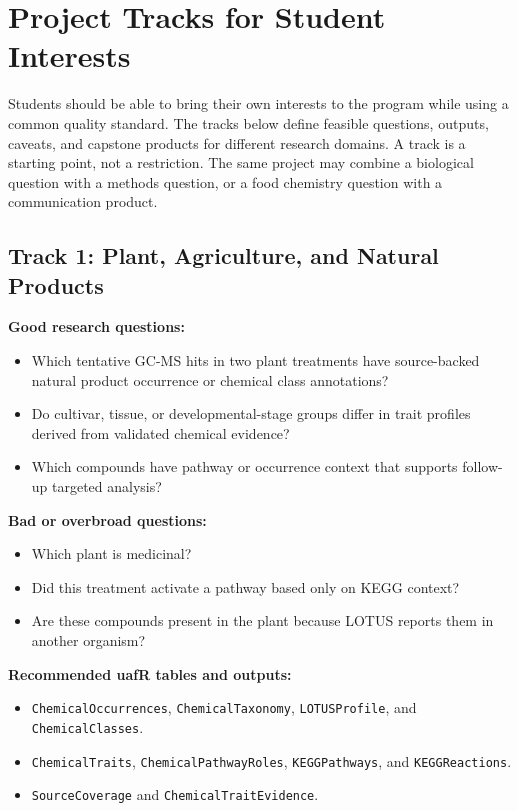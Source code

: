 \chapter{Project Tracks for Student Interests}

Students should be able to bring their own interests to the program while using a common quality standard. The tracks below define feasible questions, outputs, caveats, and capstone products for different research domains. A track is a starting point, not a restriction. The same project may combine a biological question with a methods question, or a food chemistry question with a communication product.

\section{Track 1: Plant, Agriculture, and Natural Products}
\textbf{Good research questions:}
\begin{itemize}
  \item Which tentative GC-MS hits in two plant treatments have source-backed natural product occurrence or chemical class annotations?
  \item Do cultivar, tissue, or developmental-stage groups differ in trait profiles derived from validated chemical evidence?
  \item Which compounds have pathway or occurrence context that supports follow-up targeted analysis?
\end{itemize}

\textbf{Bad or overbroad questions:}
\begin{itemize}
  \item Which plant is medicinal?
  \item Did this treatment activate a pathway based only on KEGG context?
  \item Are these compounds present in the plant because LOTUS reports them in another organism?
\end{itemize}

\textbf{Recommended uafR tables and outputs:}
\begin{itemize}
  \item \texttt{ChemicalOccurrences}, \texttt{ChemicalTaxonomy}, \texttt{LOTUSProfile}, and \texttt{ChemicalClasses}.
  \item \texttt{ChemicalTraits}, \texttt{ChemicalPathwayRoles}, \texttt{KEGGPathways}, and \texttt{KEGGReactions}.
  \item \texttt{SourceCoverage} and \texttt{ChemicalTraitEvidence}.
\end{itemize}

